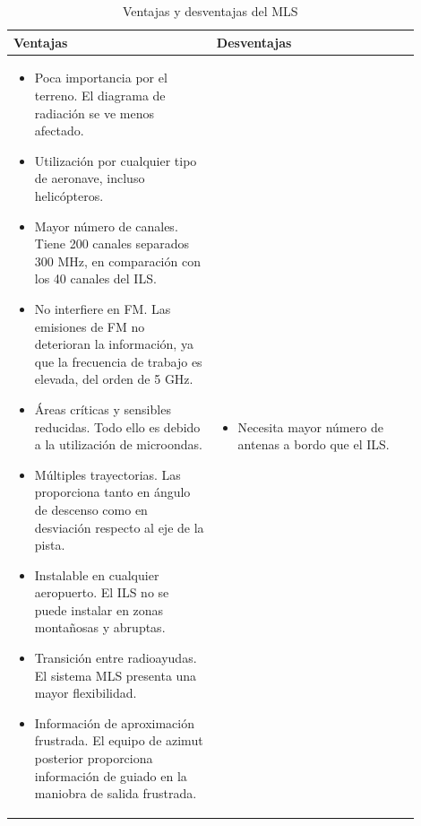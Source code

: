 \begin{landscape}
  \begin{table}[!htb]
    \centering
    \caption{Ventajas y desventajas del MLS}
    \label{tab:06.MLS.ventajas+desventajas}

    \begin{tabular}{m{0.45\linewidth}m{0.45\linewidth}}
\rowcolor{cyan!40}
      {\bf Ventajas}  & {\bf Desventajas}  \\  \hline

      \begin{itemize}
      \item Poca importancia por el terreno. El diagrama de radiación
        se ve menos afectado.
        
\item Utilización por cualquier tipo de aeronave, incluso helicópteros.

\item       Mayor número de canales. Tiene 200 canales separados 300
MHz, en comparación con los 40 canales del ILS.

\item No interfiere en FM. Las emisiones de FM no deterioran la
información, ya que la frecuencia de trabajo es elevada, del
orden de 5 GHz.

\item Áreas críticas y sensibles reducidas. Todo ello es debido a la
utilización de microondas.

\item       Múltiples trayectorias. Las proporciona tanto en ángulo de
descenso como en desviación respecto al eje de la pista.
      
\item Instalable en cualquier aeropuerto. El ILS no se puede instalar en zonas montañosas y abruptas.

\item       Transición entre radioayudas. El sistema MLS presenta una
mayor flexibilidad.

\item Información de aproximación frustrada. El equipo de azimut
posterior proporciona información de guiado en la maniobra
de salida frustrada.
\end{itemize}

&
      \begin{itemize}
        
      \item Necesita mayor número de antenas a bordo que
el ILS.


\end{itemize}
\end{tabular}
\end{table}
\end{landscape}
